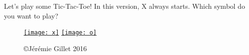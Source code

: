 \documentclass{beamer}
\begin{document}
\begin{frame}{Let's play some Tic-Tac-Toe!}
\label{start}
In this version, X always starts. Which symbol do you want to play?

\begin{figure}
\centering
\hyperlink{_________}{\texttt{[image: x]}}
\hyperlink{x________}{\texttt{[image: o]}}

\vfill
{\tiny \hfill \copyright J\'er\'emie Gillet 2016}
\end{figure}
\end{frame}



\end{document}
